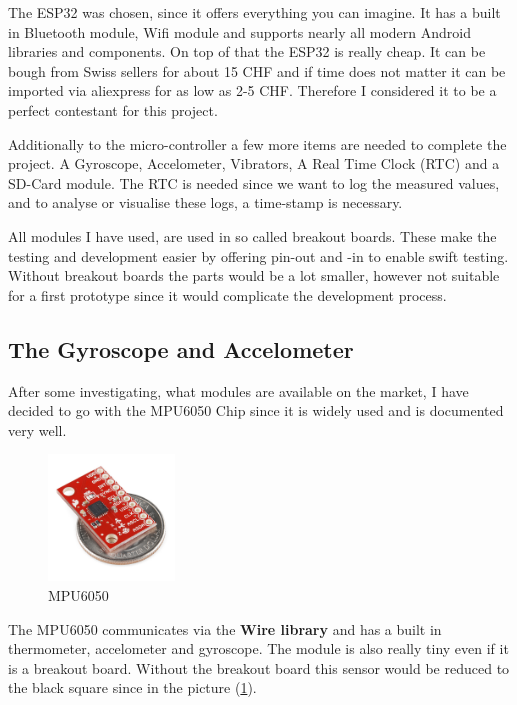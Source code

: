 The ESP32 was chosen, since it offers everything you can imagine. It has a built in Bluetooth module, Wifi module and supports nearly all modern Android libraries and components. On top of that the ESP32 is really cheap. It can be bough from Swiss sellers for about 15 CHF and if time does not matter it can be imported via aliexpress for as low as 2-5 CHF. Therefore I considered it to be a perfect contestant for this project. 

Additionally to the micro-controller a few more items are needed to complete the project. A Gyroscope, Accelometer, Vibrators, A Real Time Clock (RTC) and a SD-Card module. The RTC is needed since we want to log the measured values, and to analyse or visualise these logs, a time-stamp is necessary. 

All modules I have used, are used in so called breakout boards. These make the testing and development easier by offering pin-out and -in to enable swift testing. Without breakout boards the parts would be a lot smaller, however not suitable for a first prototype since it would complicate the development process.

\subsection{The Gyroscope and Accelometer}

After some investigating, what modules are available on the market, I have decided to go with the 
MPU6050 Chip since it is widely used and is documented very well. 

\begin{figure}
  \begin{center}
\includegraphics[width=0.3\textwidth]{images/MPU_6050.jpg}
  \end{center}
  \caption{MPU6050}
  \label{fig:MPU6050}
\end{figure}

The MPU6050 communicates via the \textbf{Wire library} and has a built in thermometer, accelometer and gyroscope. The module is also really tiny even if it is a breakout board.
Without the breakout board this sensor would be reduced to the black square since in the picture  (\ref{fig:MPU6050}).

